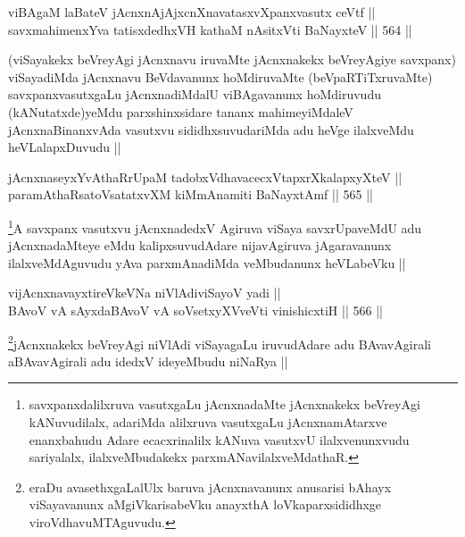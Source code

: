
\begin{shl}
viBAgaM laBateV jAcnxnAjAjxcnXnavatasxvXpanxvasutx ceVtf || \\
savxmahimenxYva tatisxdedhxVH kathaM nAsitxVti BaNayxteV ||  564 ||  
\end{shl}

\begin{artha}
(viSayakekx beVreyAgi jAcnxnavu iruvaMte jAcnxnakekx beVreyAgiye savxpanx) viSayadiMda jAcnxnavu BeVdavanunx hoMdiruvaMte (beVpaRTiTxruvaMte) savxpanxvasutxgaLu jAcnxnadiMdalU viBAgavanunx hoMdiruvudu (kANutatxde)yeMdu parxshinxsidare tananx mahimeyiMdaleV jAcnxnaBinanxvAda vasutxvu sididhxsuvudariMda adu heVge ilalxveMdu heVLalapxDuvudu ||
\end{artha}


\begin{shl}
jAcnxnaseyxYvAthaRrUpaM tadobxVdhavacecxVtapxrXkalapxyXteV || \\
paramAthaRsatoV\s satatxvXM kiMmAnamiti BaNayxtAmf ||  565 ||  
\end{shl}

\begin{artha}
\footnote{savxpanxdalilxruva vasutxgaLu jAcnxnadaMte jAcnxnakekx beVreyAgi kANuvudilalx, adariMda alilxruva vasutxgaLu jAcnxnamAtarxve enanxbahudu Adare ecacxrinalilx kANuva vasutxvU ilalxvenunxvudu sariyalalx, ilalxveMbudakekx parxmANavilalxveMdathaR.}A savxpanx vasutxvu jAcnxnadedxV Agiruva viSaya savxrUpaveMdU adu jAcnxnadaMteye eMdu kalipxsuvudAdare nijavAgiruva jAgaravanunx ilalxveMdAguvudu yAva parxmAnadiMda veMbudanunx heVLabeVku ||
\end{artha}


\begin{shl}
vijAcnxnavayxtireVkeVNa niVlAdiviSayoV yadi || \\
BAvoV vA sAyxdaBAvoV vA soV\s setxyXVveVti vinishicxtiH ||  566 ||  
\end{shl}

\begin{artha}
\footnote{eraDu avasethxgaLalUlx baruva jAcnxnavanunx anusarisi bAhayx viSayavanunx aMgiVkarisabeVku anayxthA loVkaparxsididhxge viroVdhavuMTAguvudu.}jAcnxnakekx beVreyAgi niVlAdi viSayagaLu iruvudAdare adu BAvavAgirali aBAvavAgirali adu idedxV ideyeMbudu niNaRya ||
\end{artha}

